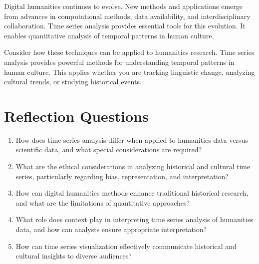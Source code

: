 Digital humanities continues to evolve. New methods and applications emerge from advances in computational methods, data availability, and interdisciplinary collaboration. Time series analysis provides essential tools for this evolution. It enables quantitative analysis of temporal patterns in human culture.

Consider how these techniques can be applied to humanities research. Time series analysis provides powerful methods for understanding temporal patterns in human culture. This applies whether you are tracking linguistic change, analyzing cultural trends, or studying historical events.

\section*{Reflection Questions}

\begin{enumerate}
\item How does time series analysis differ when applied to humanities data versus scientific data, and what special considerations are required?

\item What are the ethical considerations in analyzing historical and cultural time series, particularly regarding bias, representation, and interpretation?

\item How can digital humanities methods enhance traditional historical research, and what are the limitations of quantitative approaches?

\item What role does context play in interpreting time series analysis of humanities data, and how can analysts ensure appropriate interpretation?

\item How can time series visualization effectively communicate historical and cultural insights to diverse audiences?
\end{enumerate}

